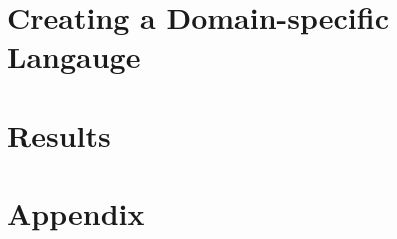 \part{Creating a Domain-specific Langauge}

\cleardoublepage


\cleardoublepage


\cleardoublepage

\part{Results}

\cleardoublepage




\appendix
\cleardoublepage
\part{Appendix}



\cleardoublepage
\cleardoublepage
\cleardoublepage

\nocite{chervenak:2001}
\nocite{pronk:2011}
\nocite{morrison:online}
\nocite{morrison:2010}
\nocite{pycparser:online}
\nocite{ply:online}
\nocite{bnfc:online}


